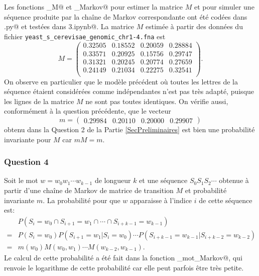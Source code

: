 \documentclass[a4paper,12pt]{article}
\begin{document}
Les fonctions \verb@estim_M@ et \verb@simule_Markov@ pour estimer la matrice $M$ et pour simuler une séquence produite par la chaîne de Markov correspondante ont été codées dans \verb@projet.py@ et testées dans \verb@Projet3.ipynb@. La matrice $M$ estimée à partir des données du fichier \texttt{yeast\_\allowbreak{}s\_\allowbreak{}cerevisae\_\allowbreak{}genomic\_\allowbreak{}chr1-4\allowbreak{}.fna} est
\[
M = 
\begin{pmatrix}
0.32505 & 0.18552 & 0.20059 & 0.28884 \\
0.33571 & 0.20925 & 0.15756 & 0.29747 \\
0.31321 & 0.20245 & 0.20774 & 0.27659 \\
0.24149 & 0.21034 & 0.22275 & 0.32541 \\
\end{pmatrix}.
\]
On observe en particulier que le modèle précédent où toutes les lettres de la séquence étaient considérées comme indépendantes n'est pas très adapté, puisque les lignes de la matrice $M$ ne sont pas toutes identiques. On vérifie aussi, conformément à la question précédente, que le vecteur
\[
m = 
\begin{pmatrix}
0.29984 & 0.20110 & 0.20000 & 0.29907
\end{pmatrix}
\]
obtenu dans la Question 2 de la Partie \ref{SecPreliminaires} est bien une probabilité invariante pour $M$ car $m M = m$.

\subsubsection*{Question 4}

Soit le mot $w = w_0 w_1 \dotsm w_{k-1}$ de longueur $k$ et une séquence $S_0 S_1 S_2 \dotsm$ obtenue à partir d'une chaîne de Markov de matrice de transition $M$ et probabilité invariante $m$. La probabilité pour que $w$ apparaisse à l'indice $i$ de cette séquence est:
\begin{align*}
 & P(S_i = w_0 \cap S_{i+1} = w_1 \cap \dotsb \cap S_{i+k-1} = w_{k-1}) \\
{} = {} & P(S_i = w_0) P(S_{i+1} = w_1 | S_i = w_0) \dotsm P(S_{i+k-1} = w_{k-1} | S_{i+k-2} = w_{k-2}) \\
{} = {} & m(w_0) M(w_0, w_1) \dotsm M(w_{k-2}, w_{k-1}).
\end{align*}
Le calcul de cette probabilité a été fait dans la fonction \verb@logproba_mot_Markov@, qui renvoie le logarithme de cette probabilité car elle peut parfois être très petite.
\end{document}
